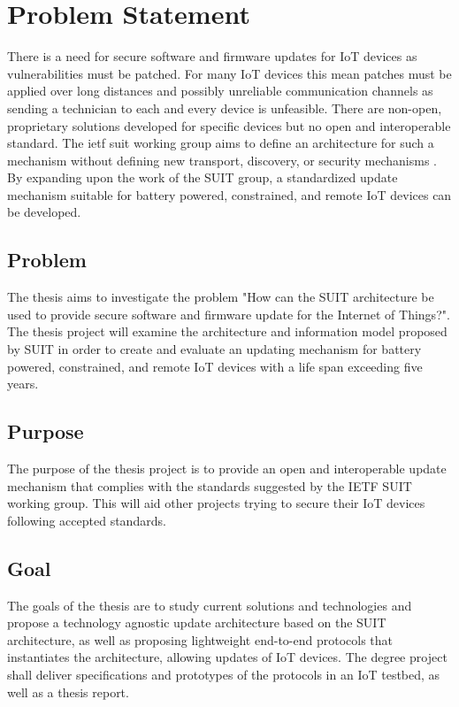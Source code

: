 \documentclass[0-thesis.tex]{subfiles}
\begin{document}
\section{Problem Statement}
There is a need for secure software and firmware updates for IoT devices as
vulnerabilities must be patched. For many IoT devices this mean patches must be applied
over long distances and possibly unreliable communication channels as sending a technician
to each and every device is unfeasible. There are non-open, proprietary solutions
developed for specific devices but no open and interoperable standard. The \gls{ietf}
\gls{suit} working group aims to define an architecture for such a mechanism without
defining new transport, discovery, or security mechanisms \parencite{suit}. By expanding
upon the work of the SUIT group, a standardized update mechanism suitable for battery
powered, constrained, and remote IoT devices can be developed.

\subsection{Problem}
The thesis aims to investigate the problem "How can the SUIT architecture be used to
provide secure software and firmware update for the Internet of Things?". The thesis
project will examine the architecture and information model proposed by SUIT in order to
create and evaluate an updating mechanism for battery powered, constrained, and remote IoT
devices with a life span exceeding five years. 

\subsection{Purpose}
The purpose of the thesis project is to provide an open and interoperable update mechanism
that complies with the standards suggested by the IETF SUIT working group. This will aid
other projects trying to secure their IoT devices following accepted standards.

\subsection{Goal}
The goals of the thesis are to study current solutions and technologies and propose a
technology agnostic update architecture based on the SUIT architecture, as well as
proposing lightweight end-to-end protocols that instantiates the architecture, allowing
updates of IoT devices. The degree project shall deliver specifications and prototypes of
the protocols in an IoT testbed, as well as a thesis report.
\end{document}
